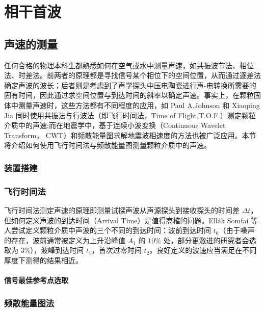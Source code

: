 
\chapter{相干首波}

\section{声速的测量}

任何合格的物理本科生都熟悉如何在空气或水中测量声速，如共振波节法、相位法、时差法。前两者的原理都是寻找信号某个相位下的空间位置，从而通过逐差法确定声波的波长；后者则是考虑到了声学探头中压电陶瓷进行声-电转换所需要的固有时间，因此通过求空间位置与到达时间的斜率以确定声速。事实上，在颗粒固体中测量声速时，这些方法都有不同程度的应用，如 Paul A.Johnson 和 Xiaoping Jia 同时使用共振法与行波法（即飞行时间法，Time of Flight,T.O.F.）测定颗粒介质中的声速\cite{Johnson_2005};而在地震学中，基于连续小波变换（Continuous Wavelet Transform， CWT）和频散能量图求解地震波相速度的方法也被广泛应用。本节将介绍如何使用飞行时间法与频散能量图测量颗粒介质中的声速。

\subsection{装置搭建}



\subsection{飞行时间法}

飞行时间法测定声速的原理即测量试探声波从声源探头到接收探头的时间差 $\Delta t$，但如何定义声波的到达时间（Arrival Time）是值得商榷的问题。Ellák Somfai 等人尝试定义颗粒介质中声波的三个不同的到达时间：波前到达时间 $t_{0}$（由于噪声的存在，波前通常被定义为上升沿峰值 $A_{1}$ 的 $\num{10}\%$ 处，部分更激进的研究者会选取为 $3\%$），波峰到达时间 $t_{1}$，首次过零时间 $t_{2}$\cite{PhysRevE.72.021301}。良好定义的波速应当满足在不同厚度下测得的结果相近。

\subsubsection{信号最佳参考点选取}

\subsection{频散能量图法}

